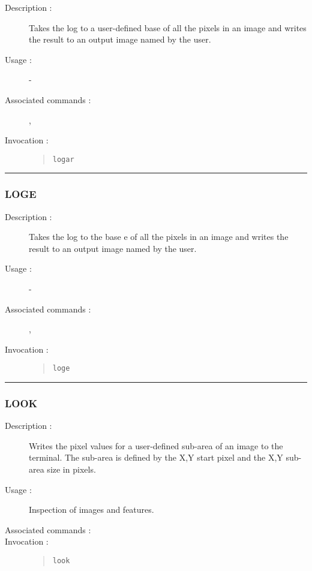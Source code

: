 \begin{description}

\item[Description :] Takes the log to a user-defined base of all the
pixels in an image and writes the result to an output image named by
the user.

\item[Usage :] -
\item[Associated commands :] {\tt {}}, 
{\tt {}}
\item[Invocation :]

\begin{quote}{\tt  logar }\end{quote}

\end{description}

\hrule 
\subsubsection*{\label{LOGE}LOGE}

\begin{description}

\item[Description :] Takes the log to the base e of all the pixels in
an image and writes the result to an output image named by the user.

\item[Usage :] -
\item[Associated commands :] {\tt {}}, 
{\tt {}}
\item[Invocation :]

\begin{quote}{\tt  loge }\end{quote}

\end{description}

\hrule 
\subsubsection*{\label{LOOK}LOOK}

\begin{description}

\item[Description :] Writes the pixel values for a user-defined
sub-area of an image to the terminal. The sub-area is defined by the
X,Y start pixel and the X,Y sub-area size in pixels.

\item[Usage :] Inspection of images and features.
\item[Associated commands :] {\tt {}}
\item[Invocation :]

\begin{quote}{\tt  look }\end{quote}

\end{description}

